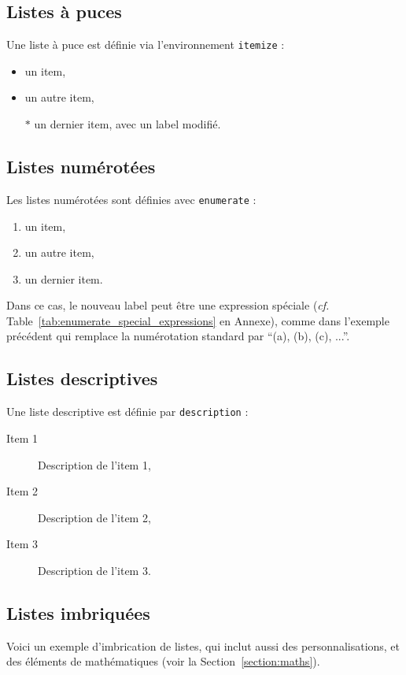 \documentclass[a4paper, 12pt]{report}
\begin{document}
    
    \subsection{Listes à puces}
    Une liste à puce est définie via l'environnement \verb+itemize+ :
    \begin{itemize}
        \item un item,
        \item un autre item,
        \item[$*$] un dernier item, avec un label modifié.
    \end{itemize}
    
    \subsection{Listes numérotées}
    Les listes numérotées sont définies avec \verb+enumerate+ :
    \begin{enumerate}[label=(\alph*)]
        \item un item,
        \item un autre item,
        \item un dernier item.
    \end{enumerate}
      Dans ce cas, le nouveau label peut être une expression spéciale (\emph{cf.} Table~\ref{tab:enumerate_special_expressions} en Annexe), comme dans l'exemple précédent qui remplace la numérotation standard par \enquote{(a), (b), (c), ...}.
    
    \subsection{Listes descriptives}
    Une liste descriptive est définie par \verb+description+ :
    \begin{description}
        \item[Item 1] Description de l'item 1,
        \item[Item 2] Description de l'item 2,
        \item[Item 3] Description de l'item 3.
    \end{description}

    \subsection{Listes imbriquées}
    Voici un exemple d'imbrication de listes, qui inclut aussi des personnalisations, et des éléments de mathématiques (voir la Section~\ref{section:maths}).
    
\end{document}
